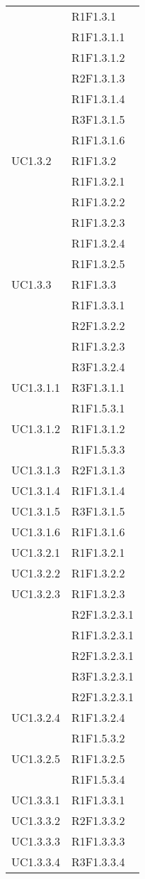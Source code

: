 \begin{longtable}{|>{\centering}m{5cm}|m{5cm}<{\centering}|}
{UC1.3.1}&{R1F1.3.1}\\
&{R1F1.3.1.1}\\
&{R1F1.3.1.2}\\
&{R2F1.3.1.3}\\
&{R1F1.3.1.4}\\
&{R3F1.3.1.5}\\
&{R1F1.3.1.6}\\ \hline
{UC1.3.2}&{R1F1.3.2}\\
&{R1F1.3.2.1}\\
&{R1F1.3.2.2}\\
&{R1F1.3.2.3}\\
&{R1F1.3.2.4}\\
&{R1F1.3.2.5}\\ \hline
{UC1.3.3}&{R1F1.3.3}\\
&{R1F1.3.3.1}\\
&{R2F1.3.2.2}\\
&{R1F1.3.2.3}\\
&{R3F1.3.2.4}\\ \hline
{UC1.3.1.1}&{R3F1.3.1.1}\\
&{R1F1.5.3.1}\\ \hline
{UC1.3.1.2}&{R1F1.3.1.2}\\
&{R1F1.5.3.3}\\ \hline
{UC1.3.1.3}&{R2F1.3.1.3}\\ \hline
{UC1.3.1.4}&{R1F1.3.1.4}\\ \hline
{UC1.3.1.5}&{R3F1.3.1.5}\\ \hline
{UC1.3.1.6}&{R1F1.3.1.6}\\ \hline
{UC1.3.2.1}&{R1F1.3.2.1}\\ \hline
{UC1.3.2.2}&{R1F1.3.2.2}\\ \hline
{UC1.3.2.3}&{R1F1.3.2.3}\\
&{R2F1.3.2.3.1}\\
&{R1F1.3.2.3.1}\\
&{R2F1.3.2.3.1}\\
&{R3F1.3.2.3.1}\\
&{R2F1.3.2.3.1}\\ \hline
{UC1.3.2.4}&{R1F1.3.2.4}\\
&{R1F1.5.3.2}\\ \hline
{UC1.3.2.5}&{R1F1.3.2.5}\\
&{R1F1.5.3.4}\\ \hline
{UC1.3.3.1}&{R1F1.3.3.1}\\ \hline
{UC1.3.3.2}&{R2F1.3.3.2}\\ \hline
{UC1.3.3.3}&{R1F1.3.3.3}\\ \hline
{UC1.3.3.4}&{R3F1.3.3.4}\\ \hline


\end{longtable}
